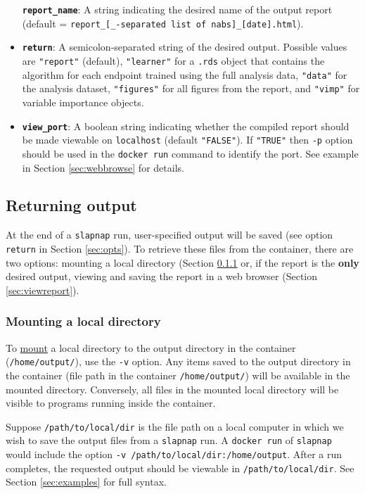 \documentclass[]{article}
\begin{document}
\begin{itemize}
  \textbf{\texttt{report\_name}}: A string indicating the desired name
  of the output report (default =
  \texttt{report\_{[}\_-separated\ list\ of\ nabs{]}\_{[}date{]}.html}).
\item
  \textbf{\texttt{return}}: A semicolon-separated string of the desired
  output. Possible values are \texttt{"report"} (default),
  \texttt{"learner"} for a \texttt{.rds} object that contains the
  algorithm for each endpoint trained using the full analysis data,
  \texttt{"data"} for the analysis dataset, \texttt{"figures"} for all
  figures from the report, and \texttt{"vimp"} for variable importance
  objects.
\item
  \textbf{\texttt{view\_port}}: A boolean string indicating whether the
  compiled report should be made viewable on \texttt{localhost} (default
  \texttt{"FALSE"}). If \texttt{"TRUE"} then \texttt{-p} option should
  be used in the \texttt{docker\ run} command to identify the port. See
  example in Section \ref{sec:webbrowse} for details.
\end{itemize}

\subsection{Returning output}\label{returning-output}

At the end of a \texttt{slapnap} run, user-specified output will be
saved (see option \texttt{return} in Section \ref{sec:opts}). To
retrieve these files from the container, there are two options: mounting
a local directory (Section \ref{sec:mounting} or, if the report is the
\textbf{only} desired output, viewing and saving the report in a web
browser (Section \ref{sec:viewreport}).

\subsubsection{Mounting a local directory}\label{sec:mounting}

To \href{https://docs.docker.com/storage/bind-mounts/}{mount} a local
directory to the output directory in the container
(\texttt{/home/output/}), use the \texttt{-v} option. Any items saved to
the output directory in the container (file path in the container
\texttt{/home/output/}) will be available in the mounted directory.
Conversely, all files in the mounted local directory will be visible to
programs running inside the container.

Suppose \texttt{/path/to/local/dir} is the file path on a local computer
in which we wish to save the output files from a \texttt{slapnap} run. A
\texttt{docker\ run} of \texttt{slapnap} would include the option
\texttt{-v\ /path/to/local/dir:/home/output}. After a run completes, the
requested output should be viewable in \texttt{/path/to/local/dir}. See
Section \ref{sec:examples} for full syntax.
\end{document}
